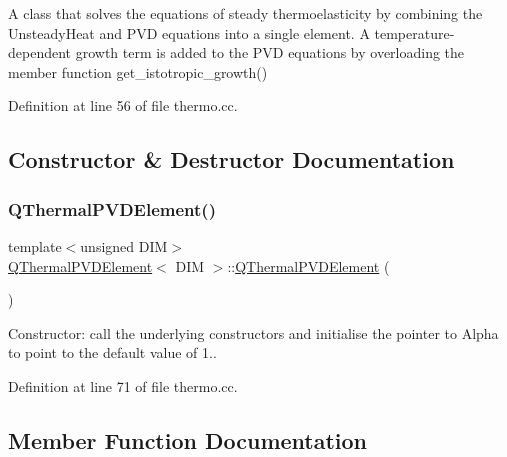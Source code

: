 A class that solves the equations of steady thermoelasticity by combining the Unsteady\+Heat and P\+VD equations into a single element. A temperature-\/dependent growth term is added to the P\+VD equations by overloading the member function get\+\_\+istotropic\+\_\+growth() 

Definition at line 56 of file thermo.\+cc.



\subsection{Constructor \& Destructor Documentation}
\mbox{\label{classQThermalPVDElement_a24d60d6461b169603388f263cbdccd75}} 
\subsubsection{\texorpdfstring{Q\+Thermal\+P\+V\+D\+Element()}{QThermalPVDElement()}}
{\footnotesize\ttfamily template$<$unsigned D\+IM$>$ \\
\hyperlink{classQThermalPVDElement}{Q\+Thermal\+P\+V\+D\+Element}$<$ D\+IM $>$\+::\hyperlink{classQThermalPVDElement}{Q\+Thermal\+P\+V\+D\+Element} (\begin{DoxyParamCaption}{ }\end{DoxyParamCaption})\hspace{0.3cm}{\ttfamily [inline]}}



Constructor\+: call the underlying constructors and initialise the pointer to Alpha to point to the default value of 1.. 



Definition at line 71 of file thermo.\+cc.



\subsection{Member Function Documentation}
\mbox{\label{classQThermalPVDElement_a59b86e75dc7b6f99a84ef17fef8d949d}} 
